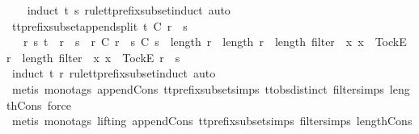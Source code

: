 %
\isadelimproof
\ \ %
\endisadelimproof
%
\isatagproof
{}\isamarkupfalse%
\ {\isacharparenleft}induct\ t\ s\ rule{\isacharcolon}tt{\isacharunderscore}prefix{\isacharunderscore}subset{\isachardot}induct{\isacharcomma}\ auto{\isacharparenright}%
\endisatagproof
{\isafoldproof}%
%
\isadelimproof
\isanewline
%
\endisadelimproof
\isanewline
{}\isamarkupfalse%
\ tt{\isacharunderscore}prefix{\isacharunderscore}subset{\isacharunderscore}append{\isacharunderscore}split{\isacharcolon}\ {\isachardoublequoteopen}t\ {\isasymlesssim}\isactrlsub C\ r\ {\isacharat}\ s\ {\isasymLongrightarrow}\isanewline
\ \ {\isasymexists}\ r{\isacharprime}\ s{\isacharprime}{\isachardot}\ t\ {\isacharequal}\ r{\isacharprime}\ {\isacharat}\ s{\isacharprime}\ {\isasymand}\ r{\isacharprime}\ {\isasymlesssim}\isactrlsub C\ r\ {\isasymand}\ s{\isacharprime}\ {\isasymlesssim}\isactrlsub C\ s\ {\isasymand}\ {\isacharparenleft}{\isacharparenleft}length\ r{\isacharprime}\ {\isacharequal}\ length\ r\ {\isasymand}\ length\ {\isacharparenleft}filter\ {\isacharparenleft}{\isasymlambda}\ x{\isachardot}\ x\ {\isacharequal}\ {\isacharbrackleft}Tock{\isacharbrackright}\isactrlsub E{\isacharparenright}\ r{\isacharprime}{\isacharparenright}\ {\isacharequal}\ length\ {\isacharparenleft}filter\ {\isacharparenleft}{\isasymlambda}\ x{\isachardot}\ x\ {\isacharequal}\ {\isacharbrackleft}Tock{\isacharbrackright}\isactrlsub E{\isacharparenright}\ r{\isacharparenright}{\isacharparenright}\ {\isasymor}\ s{\isacharprime}\ {\isacharequal}\ {\isacharbrackleft}{\isacharbrackright}{\isacharparenright}{\isachardoublequoteclose}\isanewline
%
\isadelimproof
\ \ %
\endisadelimproof
%
\isatagproof
{}\isamarkupfalse%
\ {\isacharparenleft}induct\ t\ {\isachardoublequoteopen}r{\isachardoublequoteclose}\ rule{\isacharcolon}tt{\isacharunderscore}prefix{\isacharunderscore}subset{\isachardot}induct{\isacharcomma}\ auto{\isacharparenright}\isanewline
\ \ \isamarkupfalse%
\ {\isacharparenleft}metis\ {\isacharparenleft}mono{\isacharunderscore}tags{\isacharparenright}\ append{\isacharunderscore}Cons\ tt{\isacharunderscore}prefix{\isacharunderscore}subset{\isachardot}simps{\isacharparenleft}{}{\isacharparenright}\ ttobs{\isachardot}distinct{\isacharparenleft}{}{\isacharparenright}\ filter{\isachardot}simps{\isacharparenleft}{}{\isacharparenright}\ length{\isacharunderscore}Cons{\isacharcomma}\ force{\isacharparenright}\isanewline
\ \ \isamarkupfalse%
\ {\isacharparenleft}metis\ {\isacharparenleft}mono{\isacharunderscore}tags{\isacharcomma}\ lifting{\isacharparenright}\ append{\isacharunderscore}Cons\ tt{\isacharunderscore}prefix{\isacharunderscore}subset{\isachardot}simps{\isacharparenleft}{}{\isacharparenright}\ filter{\isachardot}simps{\isacharparenleft}{}{\isacharparenright}\ length{\isacharunderscore}Cons{\isacharparenright}\isanewline
